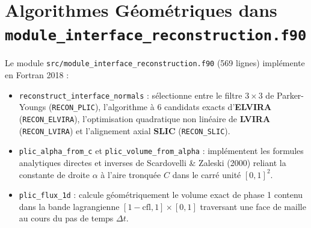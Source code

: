\documentclass[10pt,a4paper,oneside]{book}
\begin{document}
\section{Algorithmes Géométriques dans \texttt{module\_interface\_reconstruction.f90}}
Le module \texttt{src/module\_interface\_reconstruction.f90} (569 lignes) implémente en Fortran 2018 :
\begin{itemize}
  \item \texttt{reconstruct\_interface\_normals} : sélectionne entre le filtre $3\times 3$ de Parker-Youngs (\texttt{RECON\_PLIC}), l'algorithme à 6 candidats exacts d'\textbf{ELVIRA} (\texttt{RECON\_ELVIRA}), l'optimisation quadratique non linéaire de \textbf{LVIRA} (\texttt{RECON\_LVIRA}) et l'alignement axial \textbf{SLIC} (\texttt{RECON\_SLIC}).
  \item \texttt{plic\_alpha\_from\_c} et \texttt{plic\_volume\_from\_alpha} : implémentent les formules analytiques directes et inverses de Scardovelli \& Zaleski (2000) reliant la constante de droite $\alpha$ à l'aire tronquée $C$ dans le carré unité $[0, 1]^2$.
  \item \texttt{plic\_flux\_1d} : calcule géométriquement le volume exact de phase 1 contenu dans la bande lagrangienne $[1 - \text{cfl}, 1] \times [0, 1]$ traversant une face de maille au cours du pas de temps $\Delta t$.
\end{itemize}
\end{document}
